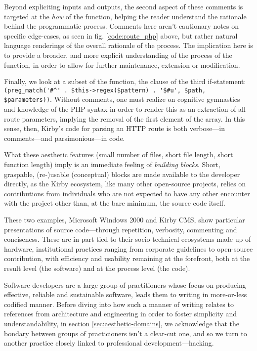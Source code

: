 Beyond expliciting inputs and outputs, the second aspect of these comments is targeted at the \emph{how} of the function, helping the reader understand the rationale behind the programmatic process. Comments here aren't cautionary notes on specific edge-cases, as seen in fig. \ref{code:route_php} above, but rather natural language renderings of the overall rationale of the process. The implication here is to provide a broader, and more explicit understanding of the process of the function, in order to allow for further maintenance, extension or modification.

Finally, we look at a subset of the function, the clause of the third if-statement: \lstinline{(preg_match('#^' . $this->regex($pattern) . '$#u', $path, $parameters))}. Without comments, one must realize on cognitive gymnastics and knowledge of the PHP syntax in order to render this as an extraction of all route parameters, implying the removal of the first element of the array. In this sense, then, Kirby's code for parsing an HTTP route is both verbose—in comments—and parsimonious—in code.

What these aesthetic features (small number of files, short file length, short function length) imply is an immediate feeling of \emph{building blocks}. Short, graspable, (re-)usable (conceptual) blocks are made available to the developer directly, as the Kirby ecosystem, like many other open-source projects, relies on contributions from individuals who are not expected to have any other encounter with the project other than, at the bare minimum, the source code itself.

These two examples, Microsoft Windows 2000 and Kirby CMS, show particular presentations of source code—through repetition, verbosity, commenting and conciseness. These are in part tied to their socio-technical ecosystems made up of hardware, institutional practices ranging from corporate guidelines to open-source contribution, with efficiency and usability remaining at the forefront, both at the result level (the software) and at the process level (the code).

Software developers are a large group of practitioners whose focus on producing effective, reliable and sustainable software, leads them to writing in more-or-less codified manner. Before diving into how such a manner of writing relates to references from architecture and engineering in order to foster simplicity and understandability, in section \ref{sec:aesthetic-domains}, we acknowledge that the bondary between groups of practicioners isn't a clear-cut one, and so we turn to another practice closely linked to professional development—hacking.

